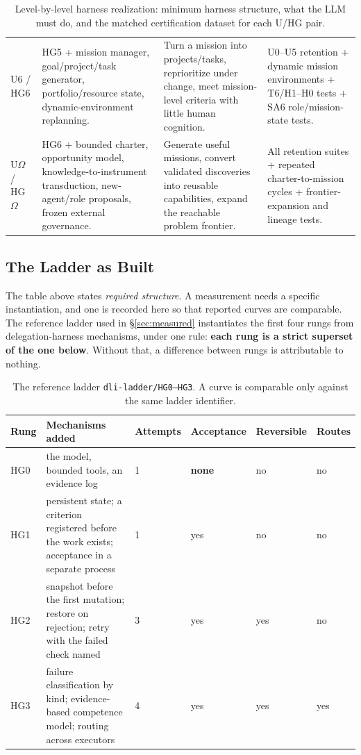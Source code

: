 \documentclass[11pt]{article}
\theoremstyle{definition}
\newcommand{\Om}{\ensuremath{\Omega}}
\begin{document}
\begin{table}[H]
\begin{tabularx}{\textwidth}{@{}p{}ZZZ@{}}
U6 / HG6 & HG5 + mission manager, goal/project/task generator, portfolio/resource state, dynamic-environment replanning. & Turn a mission into projects/tasks, reprioritize under change, meet mission-level criteria with little human cognition. & U0--U5 retention + dynamic mission environments + T6/H1--H0 tests + SA6 role/mission-state tests. \\
U\Om{} / HG\Om{} & HG6 + bounded charter, opportunity model, knowledge-to-instrument transduction, new-agent/role proposals, frozen external governance. & Generate useful missions, convert validated discoveries into reusable capabilities, expand the reachable problem frontier. & All retention suites + repeated charter-to-mission cycles + frontier-expansion and lineage tests. \\
\bottomrule
\end{tabularx}
\caption{Level-by-level harness realization: minimum harness structure, what the LLM must do, and the matched certification dataset for each U/HG pair.}
\label{tab:levelbylevel}
\end{table}

\subsection{The Ladder as Built}\label{sec:built}

The table above states \emph{required structure}. A measurement needs a specific instantiation, and one is recorded here so that reported curves are comparable. The reference ladder used in \S\ref{sec:measured} instantiates the first four rungs from delegation-harness mechanisms, under one rule: \textbf{each rung is a strict superset of the one below}. Without that, a difference between rungs is attributable to nothing.

\begin{table}[H]
\centering\small
\begin{tabularx}{\textwidth}{@{}lYllll@{}}
\toprule
Rung & Mechanisms added & Attempts & Acceptance & Reversible & Routes \\
\midrule
HG0 & the model, bounded tools, an evidence log & 1 & \textbf{none} & no & no \\
HG1 & persistent state; a criterion registered before the work exists; acceptance in a separate process & 1 & yes & no & no \\
HG2 & snapshot before the first mutation; restore on rejection; retry with the failed check named & 3 & yes & yes & no \\
HG3 & failure classification by kind; evidence-based competence model; routing across executors & 4 & yes & yes & yes \\
\bottomrule
\end{tabularx}
\caption{The reference ladder \texttt{dli-ladder/HG0--HG3}. A curve is comparable only against the same ladder identifier.}
\label{tab:ladder}
\end{table}
\end{document}
